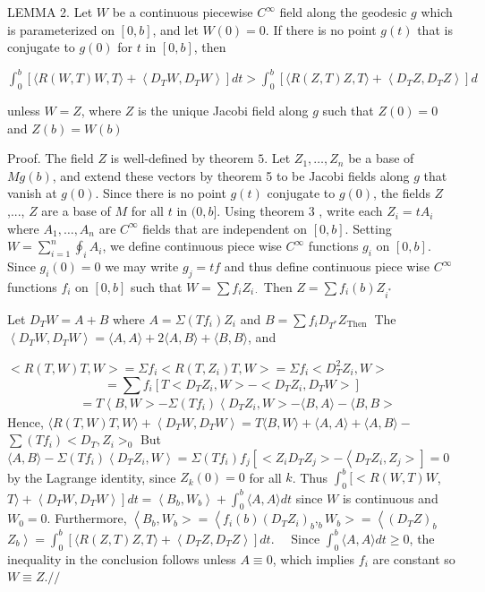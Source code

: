 \documentclass[10pt]{article}
\begin{document}
LEMMA 2. Let $W$ be a continuous piecewise $C^{\infty}$ field along the geodesic $g$ which is parameterized on $[0, b]$, and let $W(0)=0$. If there is no point $g(t)$ that is conjugate to $g(0)$ for $t$ in $[0, b]$, then

$\int_{0}^{b}\left[\langle R(W, T) W, T\rangle+\left\langle D_{T} W, D_{T} W\right\rangle\right] d t>\int_{0}^{b}\left[\langle R(Z, T) Z, T\rangle+\left\langle D_{T} Z, D_{T} Z\right\rangle\right] d$

unless $W=Z$, where $Z$ is the unique Jacobi field along $g$ such that $Z(0)=0$ and $Z(b)=W(b)$

Proof. The field $Z$ is well-defined by theorem $5 .$ Let $Z_{1}, \ldots, Z_{n}$ be a base of $M g(b)$, and extend these vectors by theorem 5 to be Jacobi fields along $g$ that vanish at $g(0)$. Since there is no point $g(t)$ conjugate to $g(0)$, the fields $Z$,..., $Z$ are a base of $M$ for all $t$ in $(0, b]$. Using theorem 3 , write each $Z_{i}=t A_{i}$ where $A_{1}, \ldots, A_{n}$ are $C^{\infty}$ fields that are independent on $[0, b]$. Setting $W=\sum_{i=1}^{n} \oint_{i} A_{i}$, we define continuous piece wise $C^{\infty}$ functions $g_{i}$ on $[0, b]$. Since $g_{i}(0)=0$ we may write $g_{j}=t f$ and thus define continuous piece wise $C^{\infty}$ functions $f_{i}$ on $[0, b]$ such that $W=\sum f_{i} Z_{i \cdot}$ Then $Z=\sum f_{i}(b) Z_{i^{*}}$

Let $D_{T} W=A+B$ where $A=\Sigma\left(T f_{i}\right) Z_{i}$ and $B=\sum f_{i} D_{T^{*}} Z_{\text {Then }}$ The $\left\langle D_{T} W, D_{T} W\right\rangle=\langle A, A\rangle+2\langle A, B\rangle+\langle B, B\rangle$, and

$<R(T, W) T, W>=\Sigma f_{i}<R\left(T, Z_{i}\right) T, W>=\Sigma f_{i}<D_{T}^{2} Z_{i}, W>$
$$
=\sum f_{i}\left[T<D_{T} Z_{i}, W>-<D_{T} Z_{i}, D_{T} W>\right]
$$
$$
\begin{aligned}
& =T\left\langle B, W>-\Sigma\left(T f_{i}\right)\left\langle D_{T} Z_{i}, W>-\langle B, A\rangle-\langle B, B>\right.\right.
\end{aligned}
$$
Hence, $\langle R(T, W) T, W\rangle+\left\langle D{ }_{T} W, D_{T} W\right\rangle=T\langle B, W\rangle+\langle A, A\rangle+\langle A, B\rangle-$ $\sum\left(T f_{i}\right)<D_{T}, Z_{i}>_{0}$ But $\langle A, B\rangle-\Sigma\left(T f_{i}\right)\left\langle D_{T} Z_{i}, W\right\rangle=\Sigma\left(T f_{i}\right) f_{j}\left[<Z_{i} D_{T} Z_{j}>-\left\langle D_{T} Z_{i}, Z_{j}>\right]=0\right.$ by the Lagrange identity, since $Z_{k}(0)=0$ for all $k$. Thus $\int_{0}^{b}[<R(W, T) W$, $\left.T\rangle+\left\langle D_{T} W, D_{T} W\right\rangle\right] d t=\left\langle B_{b}, W_{b}\right\rangle+\int_{0}^{b}\langle A, A\rangle d t$ since $W$ is continuous and $W_{0}=0 .$ Furthermore, $\left\langle B_{b}, W_{b}>=\left\langle f_{i}(b)\left(D_{T} Z_{i}\right)_{b},_{b} W_{b}>=\left\langle\left(D_{T} Z\right)_{b}\right.\right.\right.$ $\left.Z_{b}\right\rangle=\int_{0}^{b}\left[\langle R(Z, T) Z, T\rangle+\left\langle D_{T} Z, D_{T} Z\right\rangle\right] d t . \quad$ Since $\int_{0}^{b}\langle A, A\rangle d t \geq 0$, the inequality in the conclusion follows unless $A \equiv 0$, which implies $f_{i}$ are constant so $W \equiv Z . / /$
\end{document}
